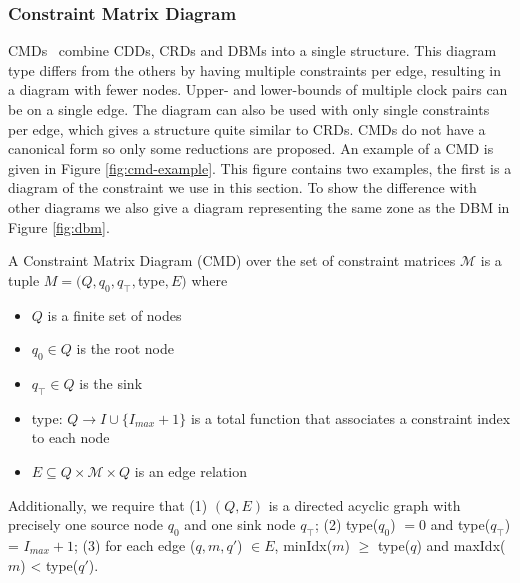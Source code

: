 \subsubsection{Constraint Matrix Diagram}
CMDs~\cite{5702245} combine CDDs, CRDs and DBMs into a single structure. This diagram type differs from the others by having multiple constraints per edge, resulting in a diagram with fewer nodes. Upper- and lower-bounds of multiple clock pairs can be on a single edge. The diagram can also be used with only single constraints per edge, which gives a structure quite similar to CRDs. CMDs do not have a canonical form so only some reductions are proposed. An example of a CMD is given in Figure \ref{fig:cmd-example}. This figure contains two examples, the first is a diagram of the constraint we use in this section. To show the difference with other diagrams we also give a diagram representing the same zone as the DBM in Figure \ref{fig:dbm}.
\begin{mydef}
A Constraint Matrix Diagram (CMD) over the set of constraint matrices $\mathcal{M}$ is a tuple $M = (Q,q_0,q_\top,$type$,E)$ where
\begin{itemize}
\item $Q$ is a finite set of nodes
\item $q_0 \in Q$ is the root node
\item $q_\top \in Q$ is the sink
\item type: $Q \rightarrow I \cup \{I_{max} + 1\}$ is a total function that associates a constraint index to each node
\item $E \subseteq Q \times \mathcal{M} \times Q$ is an edge relation
\end{itemize}
Additionally, we require that (1) $(Q,E)$ is a directed acyclic graph with precisely one source node $q_0$ and one sink node $q_\top$; (2) type($q_0$) $= 0$ and type($q_\top$) = $I_{max} + 1$; (3) for each edge ($q,m,q'$) $\in E$, minIdx($m$) $\geq$ type($q$) and maxIdx($m$) < type($q'$). 
\end{mydef}

